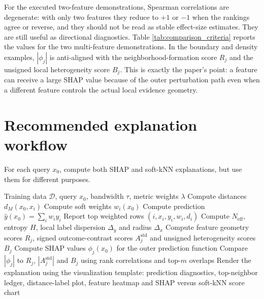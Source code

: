 \documentclass[11pt]{article}
\newcommand{\1}{\mathbf{1}}
\newcommand{\neff}{N_{\mathrm{eff}}}
\begin{document}
For the executed two-feature demonstrations, Spearman correlations are degenerate: with only two features they reduce to $+1$ or $-1$ when the rankings agree or reverse, and they should not be read as stable effect-size estimates. They are still useful as directional diagnostics. Table \ref{tab:comparison_criteria} reports the values for the two multi-feature demonstrations. In the boundary and density examples, $|\phi_j|$ is anti-aligned with the neighborhood-formation score $R_j$ and the unsigned local heterogeneity score $B_j$. This is exactly the paper's point: a feature can receive a large SHAP value because of the outer perturbation path even when a different feature controls the actual local evidence geometry.

\begin{table}[H]
\centering
\caption{Comparison criteria for the two-feature demonstrations. Because $p=2$, Spearman values are directional indicators rather than robust correlation estimates.}
\label{tab:comparison_criteria}

\end{table}

\section{Recommended explanation workflow}

For each query $x_0$, compute both SHAP and soft-kNN explanations, but use them for different purposes.

\begin{algorithm}[H]
\caption{Transparent soft-kNN explanation workflow}
\begin{algorithmic}[1]
\REQUIRE Training data $\mathcal D$, query $x_0$, bandwidth $\tau$, metric weights $\lambda$
\STATE Compute distances $d_M(x_0,x_i)$
\STATE Compute soft weights $w_i(x_0)$
\STATE Compute prediction $\hat y(x_0)=\sum_i w_i y_i$
\STATE Report top weighted rows $(i,x_i,y_i,w_i,d_i)$
\STATE Compute $\neff$, entropy $H$, local label dispersion $\Delta_y$ and radius $\Delta_x$
\STATE Compute feature geometry scores $R_j$, signed outcome-contrast scores $A_j^{\mathrm{std}}$ and unsigned heterogeneity scores $B_j$
\STATE Compute SHAP values $\phi_j(x_0)$ for the outer prediction function
\STATE Compare $|\phi_j|$ to $R_j$, $|A_j^{\mathrm{std}}|$ and $B_j$ using rank correlations and top-$m$ overlaps
\STATE Render the explanation using the visualization template: prediction diagnostics, top-neighbor ledger, distance-label plot, feature heatmap and SHAP versus soft-kNN score chart
\end{algorithmic}
\end{algorithm}
\end{document}
